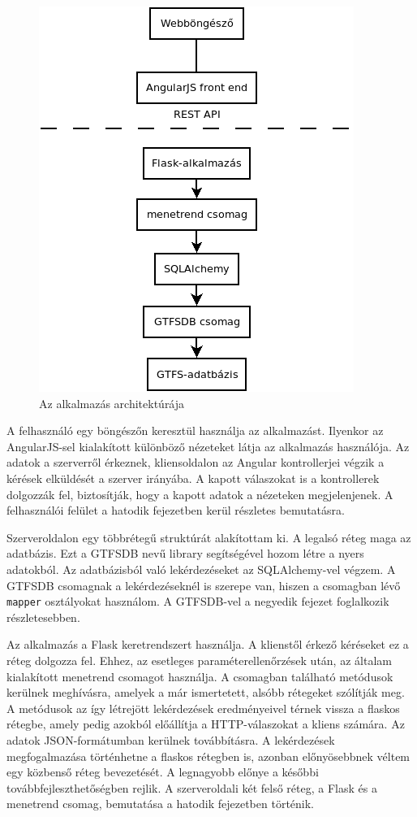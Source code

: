 \begin{figure}[htb]
\centering
\includegraphics[scale=0.7]{kepek/architecture.png}
\caption{Az alkalmazás architektúrája}
\label{fig:architecture}
\end{figure}

A felhasználó egy böngészőn keresztül használja az alkalmazást. Ilyenkor az An\-gu\-lar\-JS-sel kialakított különböző nézeteket látja az alkalmazás használója. Az adatok a szerverről érkeznek, kliensoldalon az Angular kontrollerjei végzik a kérések elküldését a szerver irányába. A kapott válaszokat is a kontrollerek dolgozzák fel, biztosítják, hogy a kapott adatok a nézeteken megjelenjenek. A felhasználói felület a hatodik fejezetben kerül részletes bemutatásra.

Szerveroldalon egy többrétegű struktúrát alakítottam ki. A legalsó réteg maga az adatbázis. Ezt a GTFSDB nevű library segítségével hozom létre a nyers adatokból. Az adatbázisból való lekérdezéseket az SQLAlchemy-vel végzem. A GTFSDB csomagnak a lekérdezéseknél is szerepe van, hiszen a csomagban lévő \texttt{mapper} osztályokat használom. A GTFSDB-vel a negyedik fejezet foglalkozik részletesebben.

Az alkalmazás a Flask keretrendszert használja. A klienstől érkező kéréseket ez a réteg dolgozza fel. Ehhez, az esetleges paraméterellenőrzések után, az általam kialakított menetrend csomagot használja. A csomagban található metódusok kerülnek meghívásra, amelyek a már ismertetett, alsóbb rétegeket szólítják meg. A metódusok az így létrejött lekérdezések eredményeivel térnek vissza a flaskos rétegbe, amely pedig azokból előállítja a HTTP-válaszokat a kliens számára. Az adatok JSON-formátumban kerülnek továbbításra. A lekérdezések megfogalmazása történhetne a flaskos rétegben is, azonban előnyösebbnek véltem egy közbenső réteg bevezetését. A legnagyobb előnye a későbbi továbbfejleszthetőségben rejlik. A szerveroldali két felső réteg, a Flask és a menetrend csomag, bemutatása a hatodik fejezetben történik.
